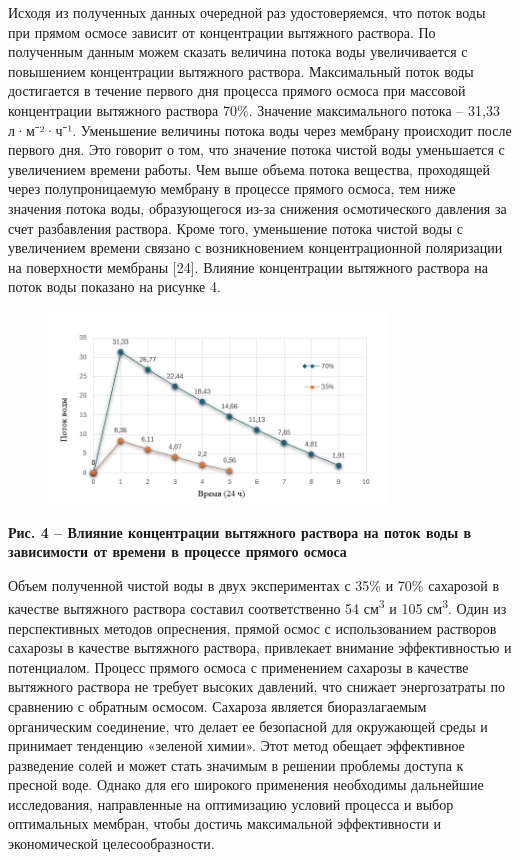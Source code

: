 Исходя из полученных данных очередной раз удостоверяемся, что поток воды
при прямом осмосе зависит от концентрации вытяжного раствора. По
полученным данным можем сказать величина потока воды увеличивается с
повышением концентрации вытяжного раствора. Максимальный поток воды
достигается в течение первого дня процесса прямого осмоса при массовой
концентрации вытяжного раствора 70\%. Значение максимального потока --
31,33 л·м⁻²·ч⁻¹. Уменьшение величины потока воды через мембрану
происходит после первого дня. Это говорит о том, что значение потока
чистой воды уменьшается с увеличением времени работы. Чем выше объема
потока вещества, проходящей через полупроницаемую мембрану в процессе
прямого осмоса, тем ниже значения потока воды, образующегося из-за
снижения осмотического давления за счет разбавления раствора. Кроме
того, уменьшение потока чистой воды с увеличением времени связано с
возникновением концентрационной поляризации на поверхности мембраны
{[}24{]}. Влияние концентрации вытяжного раствора на поток воды показано
на рисунке 4.

\begin{figure}[H]
	\centering
	\includegraphics[width=0.8\textwidth]{media/chem/image28}
	\caption*{}
\end{figure}


{\bfseries Рис. 4 -- Влияние концентрации вытяжного раствора на поток воды
в зависимости от времени в процессе прямого осмоса}

Объем полученной чистой воды в двух экспериментах с 35\% и 70\%
сахарозой в качестве вытяжного раствора составил соответственно 54
см\textsuperscript{3} и 105 см\textsuperscript{3}. Один из перспективных
методов опреснения, прямой осмос с использованием растворов сахарозы в
качестве вытяжного раствора, привлекает внимание эффективностью и
потенциалом. Процесс прямого осмоса с применением сахарозы в качестве
вытяжного раствора не требует высоких давлений, что снижает
энергозатраты по сравнению с обратным осмосом. Сахароза является
биоразлагаемым органическим соединение, что делает ее безопасной для
окружающей среды и принимает тенденцию «зеленой химии». Этот метод
обещает эффективное разведение солей и может стать значимым в решении
проблемы доступа к пресной воде. Однако для его широкого применения
необходимы дальнейшие исследования, направленные на оптимизацию условий
процесса и выбор оптимальных мембран, чтобы достичь максимальной
эффективности и экономической целесообразности.

